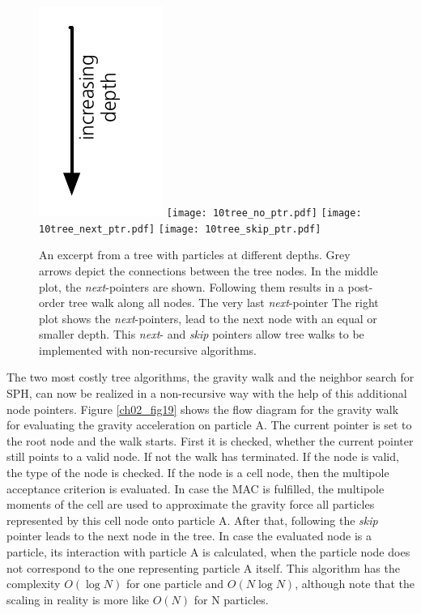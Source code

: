 \begin{figure}
\begin{center}
\includegraphics[scale=0.80]{10tree_depth.pdf}
\texttt{[image: 10tree\_no\_ptr.pdf]}
\texttt{[image: 10tree\_next\_ptr.pdf]}
\texttt{[image: 10tree\_skip\_ptr.pdf]}
\caption{An excerpt from a  tree with particles at different depths. Grey arrows depict the connections between the tree nodes. In the middle plot, the \emph{next}-pointers are shown. Following them results in a post-order tree walk along all nodes. The very last \emph{next}-pointer The right plot shows the \emph{next}-pointers, lead to the next node with an equal or smaller depth. This \emph{next}- and \emph{skip} pointers allow tree walks to be implemented with non-recursive algorithms.}
\label{ch02_fig10}
\end{center}
\end{figure}

The two most costly tree algorithms, the gravity walk and the neighbor search for SPH, can now be realized in a non-recursive way with the help of this additional node pointers. Figure \ref{ch02_fig19} shows the flow diagram for the gravity walk for evaluating the gravity acceleration on particle A. The current pointer is set to the root node and the walk starts. First it is checked, whether the current pointer still points to a valid node. If not the walk has terminated. If the node is valid, the type of the node is checked. If the node is a cell node, then the multipole acceptance criterion is evaluated. In case the MAC is fulfilled, the multipole moments of the cell are used to approximate the gravity force all particles represented by this cell node onto particle A. After that, following the \emph{skip} pointer leads to the next node in the tree. In case the evaluated node is a particle, its interaction with particle A is calculated, when the particle node does not correspond to the one representing particle A itself. This algorithm has the complexity $O(\log{N})$ for one particle and $O(N \log{N})$, although \cite{Barnes:1986p2853} note that the scaling in reality is more like $O(N)$ for N particles.

